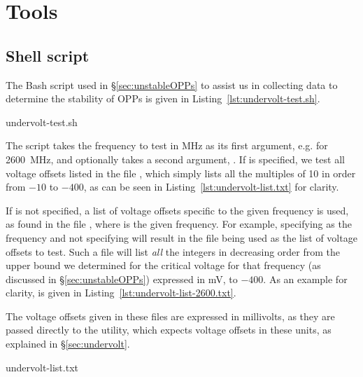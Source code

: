 \section{Tools}
\label{sec:tools}

\subsection{Shell script}
\label{sec:undervolt-test.sh}

The Bash script used in §\ref{sec:unstableOPPs} to assist us in collecting data
to determine the stability of OPPs is given in Listing~\ref{lst:undervolt-test.sh}.

\newpage


    {undervolt-test.sh}

The script takes the frequency to test in MHz as its first argument, e.g.
 for 2600~MHz, and optionally takes a second argument, .
If  is specified, we test all voltage offsets listed in the file
, which simply lists all the multiples of 10 in order
from $-10$ to $-400$, as can be seen in Listing~\ref{lst:undervolt-list.txt}
for clarity.

If  is not specified, a list of voltage offsets specific
to the given frequency is used, as found in the file
, where  is the given
frequency. For example, specifying  as the frequency and not
specifying  will result in the file 
being used as the list of voltage offsets to test. Such a file will list
\emph{all} the integers in decreasing order from the upper bound we determined
for the critical voltage for that frequency (as discussed in §\ref{sec:unstableOPPs})
expressed in mV, to $-400$.
As an example for clarity,  is given in
Listing~\ref{lst:undervolt-list-2600.txt}.

The voltage offsets given in these files are expressed in millivolts, as they
are passed directly to the  utility, which expects voltage
offsets in these units, as explained in §\ref{sec:undervolt}.


    {undervolt-list.txt}

